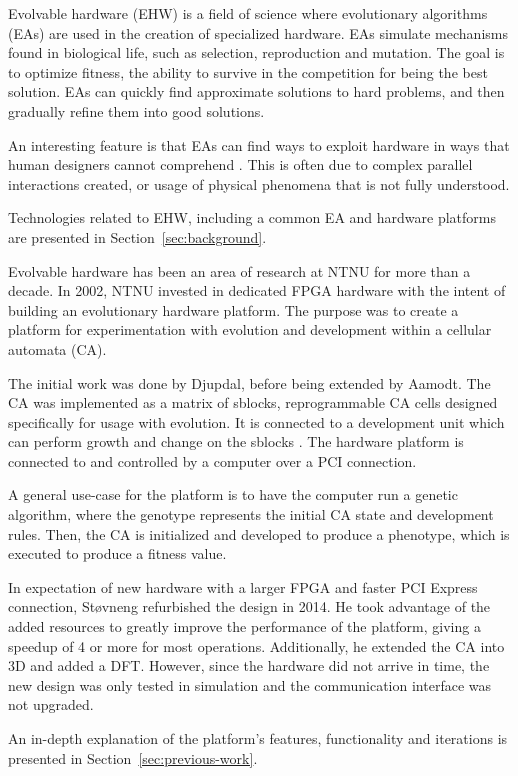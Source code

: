 Evolvable hardware (EHW) is a field of science where evolutionary algorithms (EAs) are used in the creation of specialized hardware.
EAs simulate mechanisms found in biological life, such as selection, reproduction and mutation.
The goal is to optimize fitness, the ability to survive in the competition for being the best solution.
EAs can quickly find approximate solutions to hard problems, and then gradually refine them into good solutions.

An interesting feature is that EAs can find ways to exploit hardware in ways that human designers cannot comprehend \cite{miller2014evolution}.
This is often due to complex parallel interactions created, or usage of physical phenomena that is not fully understood.

Technologies related to EHW, including a common EA and hardware platforms are presented in Section~\ref{sec:background}.

Evolvable hardware has been an area of research at NTNU for more than a decade.
In 2002, NTNU invested in dedicated FPGA hardware with the intent of building an evolutionary hardware platform.
The purpose was to create a platform for experimentation with evolution and development within a cellular automata (CA).

The initial work was done by Djupdal, before being extended by Aamodt.
The CA was implemented as a matrix of sblocks, reprogrammable CA cells designed specifically for usage with evolution.
It is connected to a development unit which can perform growth and change on the sblocks .
The hardware platform is connected to and controlled by a computer over a PCI connection.

A general use-case for the platform is to have the computer run a genetic algorithm, where the genotype represents the initial CA state and development rules.
Then, the CA is initialized and developed to produce a phenotype, which is executed to produce a fitness value.

In expectation of new hardware with a larger FPGA and faster PCI Express connection, Støvneng refurbished the design in 2014.
He took advantage of the added resources to greatly improve the performance of the platform, giving a speedup of 4 or more for most operations.
Additionally, he extended the CA into 3D and added a DFT.
However, since the hardware did not arrive in time, the new design was only tested in simulation and the communication interface was not upgraded.

An in-depth explanation of the platform's features, functionality and iterations is presented in Section~\ref{sec:previous-work}.

